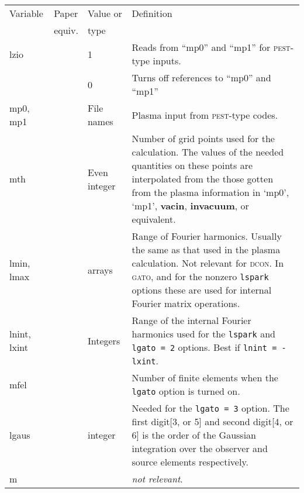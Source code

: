 \documentclass[10pt]{article}
\newcommand{\stylb}[1]{\textbf{#1}}
\newcommand{\stylc}[1]{\textsc{#1}}
\newcommand{\style}[1]{\texttt{#1}}
\newcommand{\notr}{\textsl{not relevant}}
\begin{document}
\begin{center}
\begin{tabular}{|l|l|p{1.0in}|p{3.8in}|}
\hline
Variable & Paper  & Value or &  Definition \\ 
         & equiv. &  type  & \\ \hline

lzio     &  & 1 & Reads from ``mp0'' and ``mp1'' for \stylc{pest}-type
inputs. \\
         &   & 0 & Turns off references to ``mp0'' and ``mp1''\\

mp0, mp1  &       &File names&  Plasma input from \stylc{pest}-type codes. \\

mth & & Even integer &Number of grid points used for the
                     calculation. The values of the needed quantities
                     on these points are interpolated from the those
                     gotten from the plasma information in `mp0',
                     `mp1', \stylb{vacin}, \stylb{invacuum}, or
                     equivalent.\\

lmin, lmax &      & arrays & Range of Fourier harmonics. Usually the
                    same as that used in the plasma calculation. Not
                    relevant for \stylc{dcon}. In \stylc{gato}, and
                    for the nonzero \style {lspark} options these are
                    used for internal Fourier matrix operations.\\ 

lnint, lxint&      & Integers & Range of the internal Fourier
                     harmonics used for the \style{lspark} and
                     \style{lgato = 2} options. Best if \style{lnint =
                     -lxint}. \\

mfel     &        & & Number of finite elements when the \style{lgato}
                      option is turned on. \\

lgaus    &        & integer & Needed for the \style{lgato = 3} option. The
                    first digit[3, or 5] and second digit[4, or 6] is
                    the order of the Gaussian integration over the
                    observer and source elements respectively.\\

m         &       & & \notr.\\


\end{tabular}
\end{center}
\end{document}
